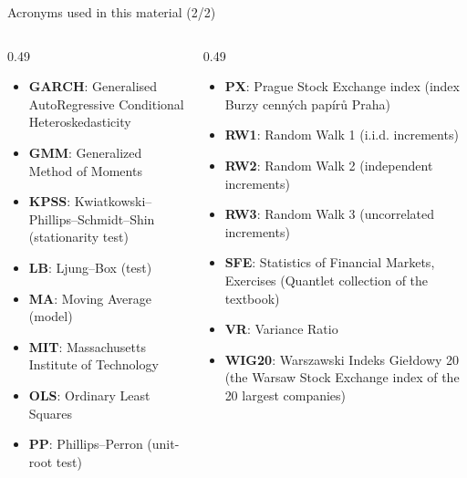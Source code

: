 \begin{frame}{Acronyms used in this material (2/2)}
\begin{columns}[T]
\begin{column}{0.49\textwidth}
\begin{itemize}\setlength{\itemsep}{0pt}
    \item \textbf{GARCH}: Generalised AutoRegressive Conditional Heteroskedasticity
    \item \textbf{GMM}: Generalized Method of Moments
    \item \textbf{KPSS}: Kwiatkowski–Phillips–Schmidt–Shin (stationarity test)
    \item \textbf{LB}: Ljung–Box (test)
    \item \textbf{MA}: Moving Average (model)
    \item \textbf{MIT}: Massachusetts Institute of Technology
    \item \textbf{OLS}: Ordinary Least Squares
    \item \textbf{PP}: Phillips–Perron (unit-root test)
\end{itemize}
\end{column}
\begin{column}{0.49\textwidth}
\begin{itemize}\setlength{\itemsep}{0pt}
    \item \textbf{PX}: Prague Stock Exchange index (index Burzy cenných papírů Praha)
    \item \textbf{RW1}: Random Walk 1 (i.i.d. increments)
    \item \textbf{RW2}: Random Walk 2 (independent increments)
    \item \textbf{RW3}: Random Walk 3 (uncorrelated increments)
    \item \textbf{SFE}: Statistics of Financial Markets, Exercises (Quantlet collection of the textbook)
    \item \textbf{VR}: Variance Ratio
    \item \textbf{WIG20}: Warszawski Indeks Giełdowy 20 (the Warsaw Stock Exchange index of the 20 largest companies)
\end{itemize}
\end{column}
\end{columns}
\end{frame}


